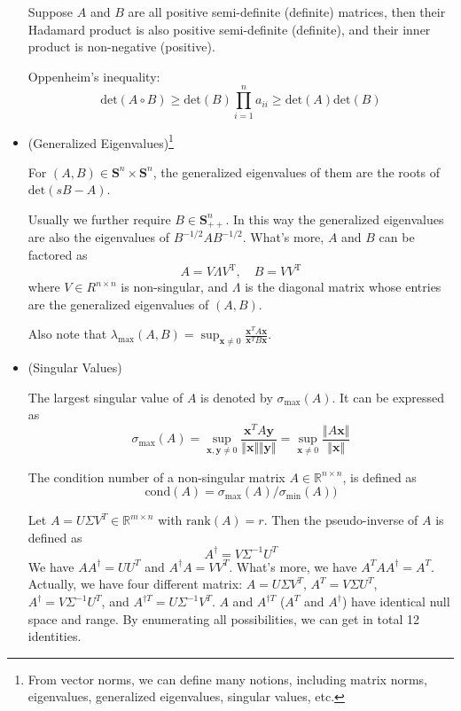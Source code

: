 \documentclass{article}
\begin{document}
\begin{itemize}
Suppose $A$ and $B$ are all positive semi-definite (definite) matrices, then their Hadamard product is also positive semi-definite (definite), and their inner product is non-negative (positive).

Oppenheim's inequality:
\begin{equation}\label{oppeni}
\mathrm{det}(A\circ B)\ge\mathrm{det}(B)\prod_{i=1}^na_{ii}\ge\mathrm{det}(A)\mathrm{det}(B)
\end{equation}

\item (Generalized Eigenvalues)\footnote{From vector norms, we can define many notions, including matrix norms, eigenvalues, generalized eigenvalues, singular values, etc.}

For $(A,B)\in\mathbf{S}^n\times\mathbf{S}^n$, the generalized eigenvalues of them are the roots of $\mathrm{det}(sB-A)$. 

Usually we further require $B\in\mathbf{S}^n_{++}$. In this way the generalized eigenvalues are also the eigenvalues of $B^{-1/2}AB^{-1/2}$. What's more, $A$ and $B$ can be factored as
\begin{equation}\label{generaleigen}
A=V\Lambda V^{\mathrm{T}},\quad B=VV^{\mathrm{T}}
\end{equation}
where $V\in R^{n\times n}$ is non-singular, and $\Lambda$ is the diagonal matrix whose entries are the generalized eigenvalues of $(A,B)$.

Also note that $\lambda_{\mathrm{max}}(A,B)=\sup_{\mathbf{x}\ne0}\frac{\mathbf{x}^TA\mathbf{x}}{\mathbf{x}^TB\mathbf{x}}$.

\item (Singular Values)

The largest singular value of $A$ is denoted by $\sigma_{\mathrm{max}}(A)$. It can be expressed as
\begin{equation}\label{sigmamax}
\sigma_{\mathrm{max}}(A)=\sup_{\mathbf{x},\mathbf{y}\ne0}\frac{\mathbf{x}^TA\mathbf{y}}{\Vert \mathbf{x}\Vert\Vert \mathbf{y}\Vert}=\sup_{\mathbf{x}\ne0}\frac{\Vert A\mathbf{x}\Vert}{\Vert \mathbf{x}\Vert}
\end{equation}

The condition number of a non-singular matrix $A\in \mathbb{R}^{n\times n}$, is defined as
\begin{equation}\label{condn}
\mathrm{cond}(A)=\sigma_{\mathrm{max}}(A)/\sigma_{\mathrm{min}}(A))
\end{equation}

Let $A=U\Sigma V^T\in \mathbb{R}^{m\times n}$ with $\mathrm{rank}(A)=r$. Then the pseudo-inverse of $A$ is defined as
\begin{equation}\label{pseudoinv}
A^{\dagger}=V\Sigma^{-1}U^T
\end{equation}
We have $AA^{\dagger}=UU^T$ and $A^{\dagger}A=VV^T$. What's more, we have $A^TAA^{\dagger}=A^T$. Actually, we have four different matrix: $A=U\Sigma V^T$, $A^T=V\Sigma U^T$, $A^{\dagger}=V\Sigma^{-1}U^T$, and $A^{\dagger T}=U\Sigma^{-1}V^T$. $A$ and $A^{\dagger T}$ ($A^T$ and $A^{\dagger}$) have identical null space and range. By enumerating all possibilities, we can get in total 12 identities.


\end{itemize}
\end{document}
